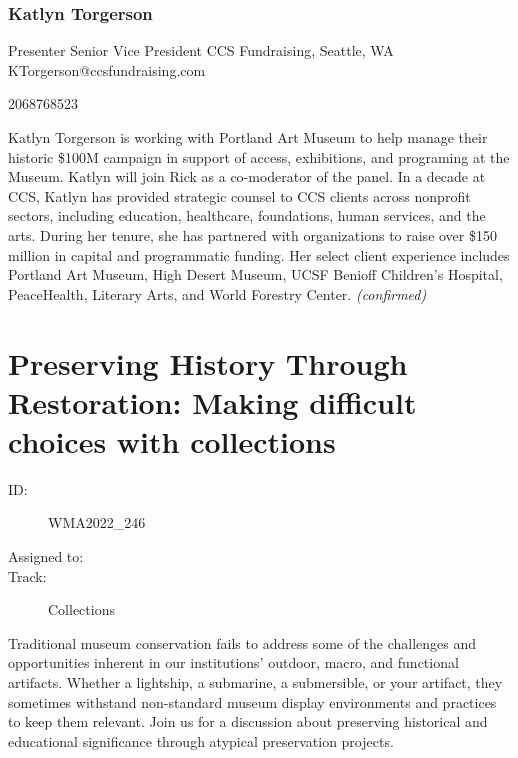 \documentclass{report}
\begin{document}
              
                \subsubsection*{ Katlyn Torgerson }
                Presenter\newline
                Senior Vice President\newline
                CCS Fundraising, Seattle, WA
                \newline
                KTorgerson@ccsfundraising.com\newline
                
                2068768523\newline

                Katlyn Torgerson is working with Portland Art Museum to help manage their historic \$100M campaign in support of access, exhibitions, and programing at the Museum. Katlyn will join Rick as a co-moderator of the panel. In a decade at CCS, Katlyn has provided strategic counsel to CCS clients across nonprofit sectors, including education, healthcare, foundations, human services, and the arts. During her tenure, she has partnered with organizations to raise over \$150 million in capital and programmatic funding. Her select client experience includes Portland Art Museum, High Desert Museum, UCSF Benioff Children’s Hospital, PeaceHealth, Literary Arts, and World Forestry Center.
                \emph{ (confirmed) }
              

              
        
          \newpage
          \section{ Preserving History Through Restoration: Making difficult choices with collections }
            \begin{description}
              \item [ID:]
              WMA2022\_246

              \item [Assigned to:]
                \item [Track:]Collections~
              \end{description}

              Traditional museum conservation fails to address some of the challenges and opportunities inherent in our institutions' outdoor, macro, and  functional artifacts. Whether a lightship, a submarine, a submersible, or your artifact, they sometimes withstand non-standard museum display environments and practices to keep them relevant. Join us for a discussion about preserving historical and educational significance through atypical preservation projects.
\end{document}
